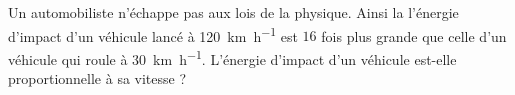 
\begin{exercice}\label{exosmath-0947}

    Un automobiliste n'échappe pas aux lois de la physique. Ainsi la l'énergie d'impact d'un véhicule lancé à \SI{120}{\kilo\meter\per\hour} est $16$ fois plus grande que celle d'un véhicule qui roule à \SI{30}{\kilo\meter\per\hour}. L'énergie d'impact d'un véhicule est-elle proportionnelle à sa vitesse ?

\end{exercice}
